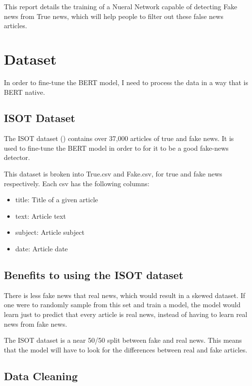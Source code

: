 \documentclass[conference]{IEEEtran}
\begin{document}
This report details the training of a Nueral Network capable of detecting Fake news from True news, which will help people to filter out these false news articles.

\section{Dataset}

In order to fine-tune the BERT model, I need to process the data in a way that is BERT native.


\subsection{ISOT Dataset}

The ISOT dataset (\cite{isot_dataset}) contains over 37,000 articles of true and fake news. It is used to fine-tune the BERT model in order to for it to be a good fake-news detector.

This dataset is broken into True.csv and Fake.csv, for true and fake news respectively. Each csv has the following columns:

\begin{itemize}
  \item title: Title of a given article
  \item text: Article text
  \item subject: Article subject
  \item date: Article date
\end{itemize}

\subsection{Benefits to using the ISOT dataset}

There is less fake news that real news, which would result in a skewed dataset. If one were to randomly sample from this set and train a model, the model would learn just to predict that every article is real news, instead of having to learn real news from fake news.

The ISOT dataset is a near 50/50 split between fake and real news. This means that the model will have to look for the differences between real and fake articles. 

\subsection{Data Cleaning}
\end{document}
